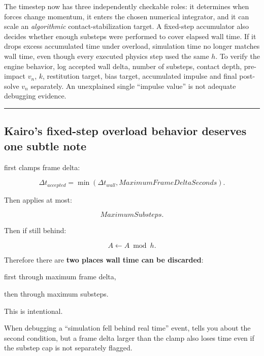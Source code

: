 The timestep now has three independently checkable roles: it determines when forces change momentum, it enters the chosen numerical integrator, and it can scale an \emph{algorithmic} contact-stabilization target. A fixed-step accumulator also decides whether enough substeps were performed to cover elapsed wall time. If it drops excess accumulated time under overload, simulation time no longer matches wall time, even though every executed physics step used the same \(h\). To verify the engine behavior, log accepted wall delta, number of substeps, contact depth, pre-impact \(v_n\), \(k\), restitution target, bias target, accumulated impulse and final post-solve \(v_n\) separately. An unexplained single ``impulse value'' is not adequate debugging evidence.

\begin{center}\rule{0.5\linewidth}{0.5pt}\end{center}

\subsection{Kairo's fixed-step overload behavior deserves one subtle note}\label{06-engine-ii-ch038-kairos-fixed-step-overload-behavior-deserves-one-subtle-note}

\hypertarget{06-engine-ii-ch038-kairos-fixed-step-overload-behavior-deserves-one-subtle-note}{}

 first clamps frame delta:

\[
\Delta t_{accepted}
=
\min(
\Delta t_{wall},
MaximumFrameDeltaSeconds).
\]

Then applies at most:

\[
MaximumSubsteps.
\]

Then if still behind:

\[
A\leftarrow A\bmod h.
\]

Therefore there are \textbf{two places wall time can be discarded}:

first through maximum frame delta,

then through maximum substeps.

This is intentional.

When debugging a ``simulation fell behind real time'' event,  tells you about the second condition, but a frame delta larger than the clamp also loses time even if the substep cap is not separately flagged.

